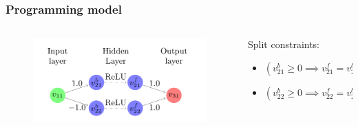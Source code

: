 \documentclass[aspectratio=169%
,serif,mathserif]{beamer}
\begin{document}
\begin{frame}
	\frametitle{Programming model}
	\begin{columns}
		\begin{column}{.5\textwidth}
			\begin{figure}[htbp]
				\includegraphics[width=1\linewidth]{4.png}
			\end{figure}
		\end{column}

		\begin{column}{.5\textwidth}
			Split constraints:
			\begin{itemize}
				\item $(v_{21}^{b} \geq 0 \implies v_{21}^{f} = v_{21}^{b}) \wedge (v_{21}^{b} \leq 0 \implies v_{21}^{f} = 0) $
				\item $(v_{22}^{b} \geq 0 \implies v_{22}^{f} = v_{22}^{b}) \wedge (v_{22}^{b} \leq 0 \implies v_{22}^{f} = 0) $
			\end{itemize}
		\end{column}
	\end{columns}
\end{frame}
\end{document}
